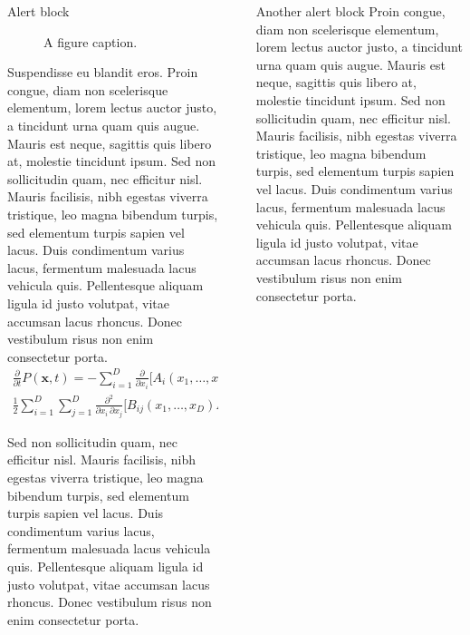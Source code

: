 \documentclass[final]{beamer}
\newlength{\sepwidth}
\newlength{\colwidth}
\newcommand{\separatorcolumn}{\begin{column}{\sepwidth}\end{column}}
\begin{document}
\begin{frame}[t]
\begin{columns}[t]
\begin{column}{\colwidth}
\begin{alertblock}{Alert block}
     \begin{figure}
      \centering
      \caption{A figure caption.}
    \end{figure}

Suspendisse eu blandit eros. Proin congue, diam non scelerisque elementum, lorem lectus auctor justo, a tincidunt urna quam quis augue. Mauris est neque, sagittis quis libero at, molestie tincidunt ipsum. Sed non sollicitudin quam, nec efficitur nisl. Mauris facilisis, nibh egestas viverra tristique, leo magna bibendum turpis, sed elementum turpis sapien vel lacus. Duis condimentum varius lacus, fermentum malesuada lacus vehicula quis. Pellentesque aliquam ligula id justo volutpat, vitae accumsan lacus rhoncus. Donec vestibulum risus non enim consectetur porta. 
\begin{align*}
    \frac{\partial}{\partial t} P(\mathbf{x},t) = -\sum_{i=1}^{D} \frac{\partial}{\partial x_i} \Big[ A_i(x_1, \ldots, x_D) P(\mathbf{x},t) \Big] + \\
    \frac{1}{2} \sum_{i=1}^{D} \sum_{j=1}^{D} \frac{\partial^2}{\partial x_i \, \partial x_j} \Big[ B_{ij}(x_1, \ldots, x_D) P(\mathbf{x},t) \Big]
\end{align*}

Sed non sollicitudin quam, nec efficitur nisl. Mauris facilisis, nibh egestas viverra tristique, leo magna bibendum turpis, sed elementum turpis sapien vel lacus. Duis condimentum varius lacus, fermentum malesuada lacus vehicula quis. Pellentesque aliquam ligula id justo volutpat, vitae accumsan lacus rhoncus. Donec vestibulum risus non enim consectetur porta. 

  \end{alertblock}


\end{column}

\separatorcolumn

\begin{column}{\colwidth}
\begin{alertblock}{Another alert block}
Proin congue, diam non scelerisque elementum, lorem lectus auctor justo, a tincidunt urna quam quis augue. Mauris est neque, sagittis quis libero at, molestie tincidunt ipsum. Sed non sollicitudin quam, nec efficitur nisl. Mauris facilisis, nibh egestas viverra tristique, leo magna bibendum turpis, sed elementum turpis sapien vel lacus. Duis condimentum varius lacus, fermentum malesuada lacus vehicula quis. Pellentesque aliquam ligula id justo volutpat, vitae accumsan lacus rhoncus. Donec vestibulum risus non enim consectetur porta. 


\end{alertblock}
\end{column}
\end{columns}
\end{frame}
\end{document}
